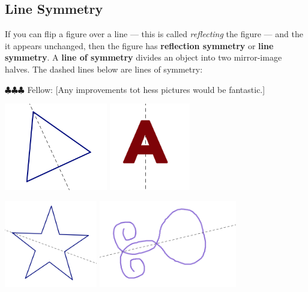 \documentclass[12pt, reqno]{amsart}
\theoremstyle{remark}
\theoremstyle{definition}
\numberwithin{equation}{section}  %
\newcommand{\fellow}[1]{{\color{magenta} \sf $\clubsuit\clubsuit\clubsuit$ Fellow: [#1]}}
\begin{document}
\newpage
\subsection{Line Symmetry}
If you can flip  a figure over a line --- this is called \emph{reflecting} the figure ---  and the it appears unchanged, then the figure has {\bf reflection symmetry} or {\bf line symmetry}.  A {\bf line of symmetry} divides an object into two mirror-image halves. The dashed lines below are lines of symmetry:

\fellow{Any improvements tot hess pictures would be fantastic.}

\begin{center}
\includegraphics[height=3.8cm]{linesym1}
\qquad \qquad
\includegraphics[height=3.8cm]{linesym2}


\includegraphics[height=3.8cm]{linesym3}
\qquad \qquad
\includegraphics[height=3.8cm]{linesym4}
\end{center}
\end{document}
